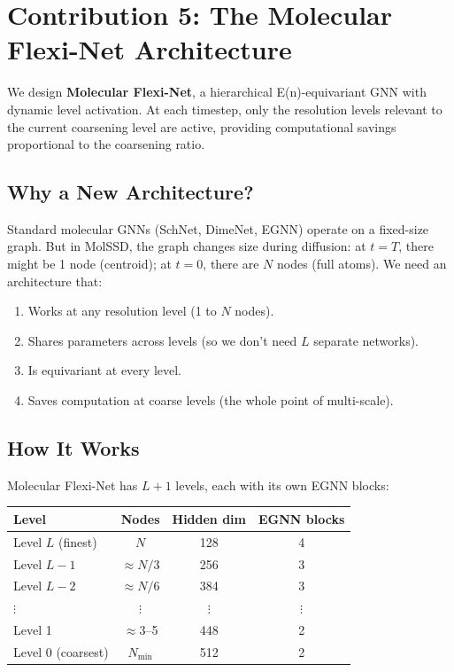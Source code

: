 \documentclass[12pt,a4paper]{article}
\begin{document}
\section{Contribution 5: The Molecular Flexi-Net Architecture}

\begin{noveltybox}
We design \textbf{Molecular Flexi-Net}, a hierarchical E(n)-equivariant GNN with dynamic level activation. At each timestep, only the resolution levels relevant to the current coarsening level are active, providing computational savings proportional to the coarsening ratio.
\end{noveltybox}

\subsection{Why a New Architecture?}

Standard molecular GNNs (SchNet, DimeNet, EGNN) operate on a fixed-size graph. But in MolSSD, the graph changes size during diffusion: at $t=T$, there might be 1 node (centroid); at $t=0$, there are $N$ nodes (full atoms). We need an architecture that:
\begin{enumerate}
  \item Works at any resolution level (1 to $N$ nodes).
  \item Shares parameters across levels (so we don't need $L$ separate networks).
  \item Is equivariant at every level.
  \item Saves computation at coarse levels (the whole point of multi-scale).
\end{enumerate}

\subsection{How It Works}

Molecular Flexi-Net has $L+1$ levels, each with its own EGNN blocks:

\begin{center}
\begin{tabular}{lccc}
\toprule
\textbf{Level} & \textbf{Nodes} & \textbf{Hidden dim} & \textbf{EGNN blocks} \\
\midrule
Level $L$ (finest) & $N$ & 128 & 4 \\
Level $L-1$ & $\approx N/3$ & 256 & 3 \\
Level $L-2$ & $\approx N/6$ & 384 & 3 \\
$\vdots$ & $\vdots$ & $\vdots$ & $\vdots$ \\
Level 1 & $\approx 3$--5 & 448 & 2 \\
Level 0 (coarsest) & $N_{\min}$ & 512 & 2 \\
\bottomrule
\end{tabular}
\end{center}
\end{document}
